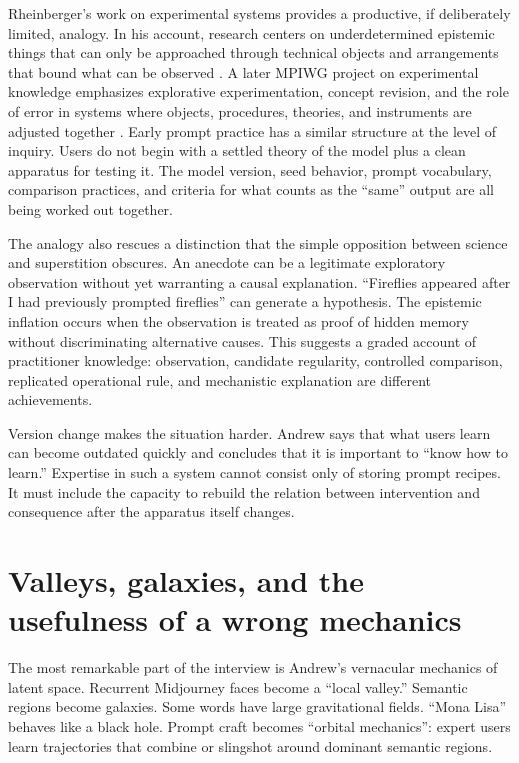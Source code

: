 \documentclass[11pt]{article}
\begin{document}
Rheinberger's work on experimental systems provides a productive, if deliberately limited, analogy. In his account, research centers on underdetermined epistemic things that can only be approached through technical objects and arrangements that bound what can be observed \citep{rheinberger2004experimental}. A later MPIWG project on experimental knowledge emphasizes explorative experimentation, concept revision, and the role of error in systems where objects, procedures, theories, and instruments are adjusted together \citep{mpiwgExperimentalKnowledge}. Early prompt practice has a similar structure at the level of inquiry. Users do not begin with a settled theory of the model plus a clean apparatus for testing it. The model version, seed behavior, prompt vocabulary, comparison practices, and criteria for what counts as the ``same'' output are all being worked out together.

The analogy also rescues a distinction that the simple opposition between science and superstition obscures. An anecdote can be a legitimate exploratory observation without yet warranting a causal explanation. ``Fireflies appeared after I had previously prompted fireflies'' can generate a hypothesis. The epistemic inflation occurs when the observation is treated as proof of hidden memory without discriminating alternative causes. This suggests a graded account of practitioner knowledge: observation, candidate regularity, controlled comparison, replicated operational rule, and mechanistic explanation are different achievements.

Version change makes the situation harder. Andrew says that what users learn can become outdated quickly and concludes that it is important to ``know how to learn.'' Expertise in such a system cannot consist only of storing prompt recipes. It must include the capacity to rebuild the relation between intervention and consequence after the apparatus itself changes.

\section{Valleys, galaxies, and the usefulness of a wrong mechanics}
The most remarkable part of the interview is Andrew's vernacular mechanics of latent space. Recurrent Midjourney faces become a ``local valley.'' Semantic regions become galaxies. Some words have large gravitational fields. ``Mona Lisa'' behaves like a black hole. Prompt craft becomes ``orbital mechanics'': expert users learn trajectories that combine or slingshot around dominant semantic regions.
\end{document}
